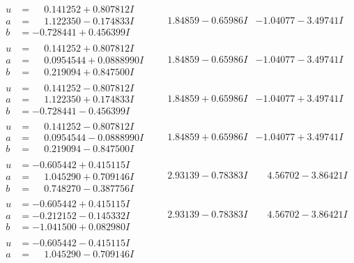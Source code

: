 \documentclass[1p]{elsarticle_modified}
\theoremstyle{definition}
\begin{document}
$$\begin{array}{c|c|c}
\begin{aligned}
u &= \phantom{-}0.141252 + 0.807812 I \\
a &= \phantom{-}1.122350 - 0.174833 I \\
b &= -0.728441 + 0.456399 I\end{aligned}
 & \phantom{-}1.84859 - 0.65986 I & -1.04077 - 3.49741 I \\ \hline\begin{aligned}
u &= \phantom{-}0.141252 + 0.807812 I \\
a &= \phantom{-}0.0954544 + 0.0888990 I \\
b &= \phantom{-}0.219094 + 0.847500 I\end{aligned}
 & \phantom{-}1.84859 - 0.65986 I & -1.04077 - 3.49741 I \\ \hline\begin{aligned}
u &= \phantom{-}0.141252 - 0.807812 I \\
a &= \phantom{-}1.122350 + 0.174833 I \\
b &= -0.728441 - 0.456399 I\end{aligned}
 & \phantom{-}1.84859 + 0.65986 I & -1.04077 + 3.49741 I \\ \hline\begin{aligned}
u &= \phantom{-}0.141252 - 0.807812 I \\
a &= \phantom{-}0.0954544 - 0.0888990 I \\
b &= \phantom{-}0.219094 - 0.847500 I\end{aligned}
 & \phantom{-}1.84859 + 0.65986 I & -1.04077 + 3.49741 I \\ \hline\begin{aligned}
u &= -0.605442 + 0.415115 I \\
a &= \phantom{-}1.045290 + 0.709146 I \\
b &= \phantom{-}0.748270 - 0.387756 I\end{aligned}
 & \phantom{-}2.93139 - 0.78383 I & \phantom{-}4.56702 - 3.86421 I \\ \hline\begin{aligned}
u &= -0.605442 + 0.415115 I \\
a &= -0.212152 - 0.145332 I \\
b &= -1.041500 + 0.082980 I\end{aligned}
 & \phantom{-}2.93139 - 0.78383 I & \phantom{-}4.56702 - 3.86421 I \\ \hline\begin{aligned}
u &= -0.605442 - 0.415115 I \\
a &= \phantom{-}1.045290 - 0.709146 I \\

\end{aligned}
\end{array}$$
\end{document}
